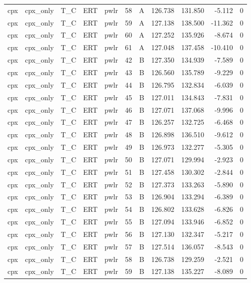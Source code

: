 \begin{longtable}{lllllrrrrrr}
cpx & cpx\_only & T\_C & ERT & pwlr & 58 & A & 126.738 & 131.850 & -5.112 & 0 \\
cpx & cpx\_only & T\_C & ERT & pwlr & 59 & A & 127.138 & 138.500 & -11.362 & 0 \\
cpx & cpx\_only & T\_C & ERT & pwlr & 60 & A & 127.252 & 135.926 & -8.674 & 0 \\
cpx & cpx\_only & T\_C & ERT & pwlr & 61 & A & 127.048 & 137.458 & -10.410 & 0 \\
cpx & cpx\_only & T\_C & ERT & pwlr & 42 & B & 127.350 & 134.939 & -7.589 & 0 \\
cpx & cpx\_only & T\_C & ERT & pwlr & 43 & B & 126.560 & 135.789 & -9.229 & 0 \\
cpx & cpx\_only & T\_C & ERT & pwlr & 44 & B & 126.795 & 132.834 & -6.039 & 0 \\
cpx & cpx\_only & T\_C & ERT & pwlr & 45 & B & 127.011 & 134.843 & -7.831 & 0 \\
cpx & cpx\_only & T\_C & ERT & pwlr & 46 & B & 127.071 & 137.068 & -9.996 & 0 \\
cpx & cpx\_only & T\_C & ERT & pwlr & 47 & B & 126.257 & 132.725 & -6.468 & 0 \\
cpx & cpx\_only & T\_C & ERT & pwlr & 48 & B & 126.898 & 136.510 & -9.612 & 0 \\
cpx & cpx\_only & T\_C & ERT & pwlr & 49 & B & 126.973 & 132.277 & -5.305 & 0 \\
cpx & cpx\_only & T\_C & ERT & pwlr & 50 & B & 127.071 & 129.994 & -2.923 & 0 \\
cpx & cpx\_only & T\_C & ERT & pwlr & 51 & B & 127.458 & 130.302 & -2.844 & 0 \\
cpx & cpx\_only & T\_C & ERT & pwlr & 52 & B & 127.373 & 133.263 & -5.890 & 0 \\
cpx & cpx\_only & T\_C & ERT & pwlr & 53 & B & 126.904 & 133.294 & -6.389 & 0 \\
cpx & cpx\_only & T\_C & ERT & pwlr & 54 & B & 126.802 & 133.628 & -6.826 & 0 \\
cpx & cpx\_only & T\_C & ERT & pwlr & 55 & B & 127.094 & 133.946 & -6.852 & 0 \\
cpx & cpx\_only & T\_C & ERT & pwlr & 56 & B & 127.130 & 132.347 & -5.217 & 0 \\
cpx & cpx\_only & T\_C & ERT & pwlr & 57 & B & 127.514 & 136.057 & -8.543 & 0 \\
cpx & cpx\_only & T\_C & ERT & pwlr & 58 & B & 126.738 & 129.259 & -2.521 & 0 \\
cpx & cpx\_only & T\_C & ERT & pwlr & 59 & B & 127.138 & 135.227 & -8.089 & 0 \\

\end{longtable}
